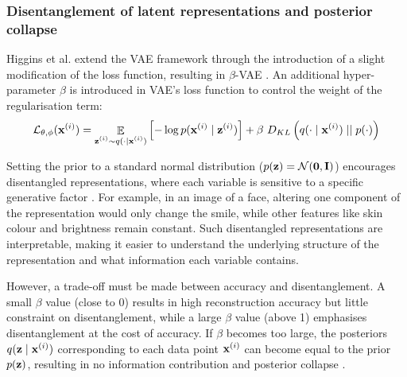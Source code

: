 \subsubsection{Disentanglement of latent representations and posterior collapse} \label{cha:disentang}
	Higgins et al. extend the VAE framework through the introduction of a slight modification of the loss function, resulting in $\beta$-VAE \cite{higginsBetaVAELearningBasic2022}. An additional hyper-parameter $\beta$ is introduced in VAE's loss function to control the weight of the regularisation term:
	$$
	\mathcal{L}_{\theta, \phi} (\mathbf{x}^{(i)}) = \mathop{\mathbb{E}}_{\substack{\mathbf{z}^{(i)} \sim q (\cdot \mid \mathbf{x}^{(i)})}} \left[ -\log p (\mathbf{x}^{(i)} \mid \mathbf{z}^{(i)}) \right] + \beta~ D_{KL} \left(  q (\cdot \mid \mathbf{x}^{(i)})  \mid \mid  p(\cdot)  \right)
	$$
	
	Setting the prior to a standard normal distribution ($p(\mathbf{z}) = \mathcal{N}(\bm{\mathbf{0}}, \mathbf{I})$) encourages disentangled representations, where each variable is sensitive to a specific generative factor \cite{higginsBetaVAELearningBasic2022, bengioRepresentationLearningReview2013}. For example, in an image of a face, altering one component of the representation would only change the smile, while other features like skin colour and brightness remain constant. Such disentangled representations are interpretable, making it easier to understand the underlying structure of the representation and what information each variable contains.
	
	However, a trade-off must be made between accuracy and disentanglement. A small $\beta$ value (close to 0) results in high reconstruction accuracy but little constraint on disentanglement, while a large $\beta$ value (above 1) emphasises disentanglement at the cost of accuracy. If $\beta$ becomes too large, the posteriors $q (\mathbf{z} \mid \mathbf{x}^{(i)})$ corresponding to each data point $\mathbf{x}^{(i)}$ can become equal to the prior $p(\mathbf{z})$, resulting in no information contribution and posterior collapse \cite{lucasUnderstandingPosteriorCollapse2022}.
	

	
	
	

%
%
	

